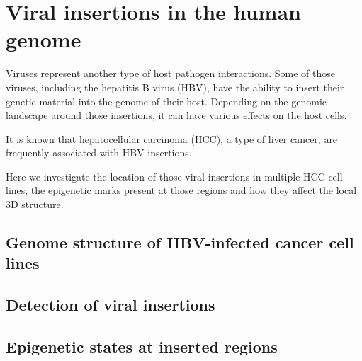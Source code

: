 
\chapter{Viral insertions in the human genome} %

Viruses represent another type of host pathogen interactions. Some of those viruses, including the hepatitis B virus (HBV), have the ability to insert their genetic material into the genome of their host. Depending on the genomic landscape around those insertions, it can have various effects on the host cells.

It is known that hepatocellular carcinoma (HCC), a type of liver cancer, are frequently associated with HBV insertions.

Here we investigate the location of those viral insertions in multiple HCC cell lines, the epigenetic marks present at those regions and how they affect the local 3D structure.

\label{ch:02-04} %


\section{Genome structure of HBV-infected cancer cell lines}

\section{Detection of viral insertions}

\section{Epigenetic states at inserted regions}

\blindtext